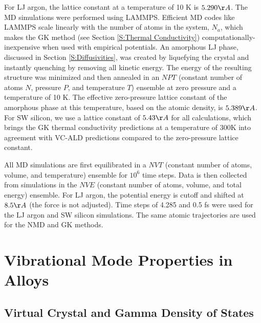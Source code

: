 \documentclass[aps,prb,onecolumn,preprint,footinbib,superscriptaddress,amsmath,amssymb,floatfix]{revtex4}
\begin{document}
For LJ argon, the lattice constant 
at a temperature of 10 K is $5.290 \AA$.\cite{mcgaughey_phonon_2004} 
The MD simulations were performed using LAMMPS.\cite{plimpton_fast_1995} 
Efficient MD 
codes like LAMMPS scale linearly with the number of atoms in 
the system, $N_a$, which makes the GK method (see Section 
\ref{S:Thermal Conductivity}) 
computationally-inexpensive when used with empirical potentials. 
An amorphous LJ phase, discussed in Section \ref{S:Diffusivities}, 
was created by liquefying the crystal 
and instantly quenching by removing all kinetic energy.  The energy 
of the resulting structure was minimized and then annealed in an 
$NPT$ (constant number of atoms $N$, pressure $P$, and temperature $T$) 
ensemble at zero pressure and a temperature of 10 K.  
The effective zero-pressure lattice constant  
of the amorphous phase at this temperature, based on the atomic 
density, is $5.389 \AA$.\cite{mcgaughey_phonon_2004} 
For SW silicon, we use a lattice constant of $5.43 \AA$ 
for all calculations, which brings the GK thermal conductivity 
predictions at a temperature of 300K
\cite{goicochea_thermal_2010,he_lattice_2012} 
into agreement with VC-ALD predictions\cite{sellan_cross-plane_2010} 
compared to the zero-pressure lattice constant. 

All MD simulations are first equilibrated in a $NVT$ (constant 
number of atoms, volume, and temperature) ensemble for 
$10^6$ time steps. Data is then collected from simulations in the $NVE$ 
(constant number of 
atoms, volume, and total energy) ensemble. For LJ argon, the potential 
energy is cutoff and shifted at $8.5 \AA$ (the force is not adjusted). 
Time steps of 4.285 and 0.5 fs were used for the LJ argon and 
SW silicon simulations. The same atomic trajectories are used for the 
NMD and GK methods. 

\section{\label{S:Vibrational}
Vibrational Mode Properties in Alloys}

\subsection{\label{S:VC Gamma DOS}Virtual Crystal and Gamma Density of 
States}
\end{document}
